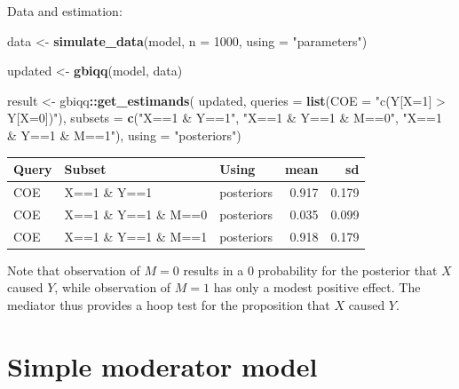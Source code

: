 \documentclass[12pt,]{book}
\newenvironment{Shaded}{\begin{snugshade}}{\end{snugshade}}
\newcommand{\DataTypeTok}[1]{\textcolor[rgb]{0.13,0.29,0.53}{#1}}
\newcommand{\DecValTok}[1]{\textcolor[rgb]{0.00,0.00,0.81}{#1}}
\newcommand{\KeywordTok}[1]{\textcolor[rgb]{0.13,0.29,0.53}{\textbf{#1}}}
\newcommand{\NormalTok}[1]{#1}
\newcommand{\OperatorTok}[1]{\textcolor[rgb]{0.81,0.36,0.00}{\textbf{#1}}}
\newcommand{\StringTok}[1]{\textcolor[rgb]{0.31,0.60,0.02}{#1}}
\begin{document}
Data and estimation:

\begin{Shaded}
\begin{Highlighting}[]
\NormalTok{data <-}\StringTok{ }\KeywordTok{simulate_data}\NormalTok{(model, }\DataTypeTok{n =} \DecValTok{1000}\NormalTok{, }\DataTypeTok{using =} \StringTok{"parameters"}\NormalTok{)}
\end{Highlighting}
\end{Shaded}

\begin{Shaded}
\begin{Highlighting}[]
\NormalTok{updated <-}\StringTok{ }\KeywordTok{gbiqq}\NormalTok{(model, data)}
\end{Highlighting}
\end{Shaded}

\begin{Shaded}
\begin{Highlighting}[]
\NormalTok{result <-}\StringTok{ }\NormalTok{gbiqq}\OperatorTok{::}\KeywordTok{get_estimands}\NormalTok{(}
\NormalTok{    updated, }
    \DataTypeTok{queries =} \KeywordTok{list}\NormalTok{(}\DataTypeTok{COE =} \StringTok{"c(Y[X=1] > Y[X=0])"}\NormalTok{), }
    \DataTypeTok{subsets =} \KeywordTok{c}\NormalTok{(}\StringTok{"X==1 & Y==1"}\NormalTok{, }\StringTok{"X==1 & Y==1 & M==0"}\NormalTok{, }\StringTok{"X==1 & Y==1 & M==1"}\NormalTok{),}
    \DataTypeTok{using =} \StringTok{"posteriors"}\NormalTok{)}
\end{Highlighting}
\end{Shaded}

\begin{tabular}{l|l|l|r|r}
\hline
Query & Subset & Using & mean & sd\\
\hline
COE & X==1 \& Y==1 & posteriors & 0.917 & 0.179\\
\hline
COE & X==1 \& Y==1 \& M==0 & posteriors & 0.035 & 0.099\\
\hline
COE & X==1 \& Y==1 \& M==1 & posteriors & 0.918 & 0.179\\
\hline
\end{tabular}

Note that observation of \(M=0\) results in a 0 probability for the posterior that \(X\) caused \(Y\), while observation of \(M=1\) has only a modest positive effect. The mediator thus provides a hoop test for the proposition that \(X\) caused \(Y\).

\hypertarget{simple-moderator-model}{%
\section{Simple moderator model}\label{simple-moderator-model}}
\end{document}
